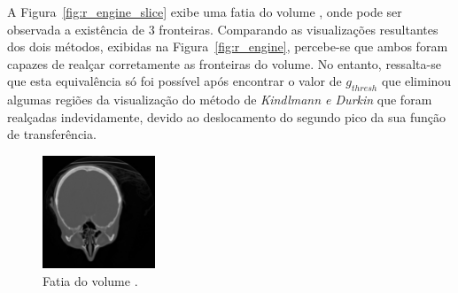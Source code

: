 A Figura~\ref{fig:r_engine_slice} exibe uma fatia do volume , onde pode ser observada a existência de $ 3 $ fronteiras. Comparando as visualizações resultantes dos dois métodos, exibidas na Figura~\ref{fig:r_engine}, percebe-se que ambos foram capazes de realçar corretamente as fronteiras do volume. No entanto, ressalta-se que esta equivalência só foi possível após encontrar o valor de $ g_{thresh} $ que eliminou algumas regiões da visualização do método de \textit{Kindlmann e Durkin} que foram realçadas indevidamente, devido ao deslocamento do segundo pico da sua função de transferência.
\clearpage
\begin{figure}[h]
	\centering
	\includegraphics[width=0.3\textwidth]{images/r_cthead_slice}
	\caption{Fatia do volume .}
	\label{fig:r_cthead_slice}
\end{figure}


